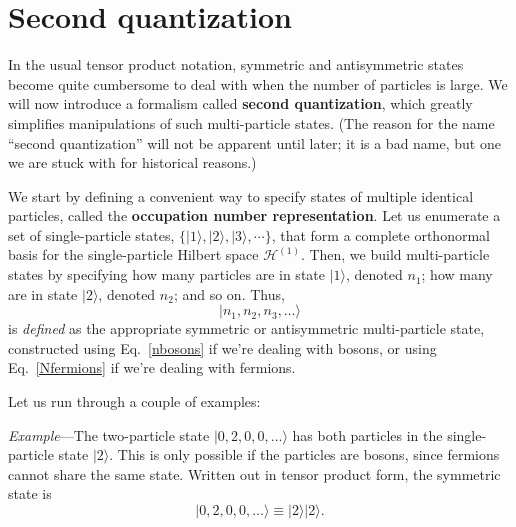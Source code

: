 \documentclass[pra,12pt]{revtex4-2}
\begin{document}
\section{Second quantization}

In the usual tensor product notation, symmetric and antisymmetric
states become quite cumbersome to deal with when the number of
particles is large.  We will now introduce a formalism called
\textbf{second quantization}, which greatly simplifies manipulations
of such multi-particle states.  (The reason for the name ``second
quantization'' will not be apparent until later; it is a bad name, but
one we are stuck with for historical reasons.)

We start by defining a convenient way to specify states of multiple
identical particles, called the \textbf{occupation number
  representation}.  Let us enumerate a set of single-particle states,
$\{|1\rangle, |2\rangle, |3\rangle, \cdots\}$, that form a complete
orthonormal basis for the single-particle Hilbert space
$\mathscr{H}^{(1)}$.  Then, we build multi-particle states by
specifying how many particles are in state $|1\rangle$, denoted $n_1$;
how many are in state $|2\rangle$, denoted $n_2$; and so on.  Thus,
\begin{equation*}
  |n_1,n_2,n_3,\dots\rangle
\end{equation*}
is \textit{defined} as the appropriate symmetric or antisymmetric
multi-particle state, constructed using Eq.~\eqref{nbosons} if we're
dealing with bosons, or using Eq.~\eqref{Nfermions} if we're dealing
with fermions.

Let us run through a couple of examples:

\begin{framed}
\noindent
\textit{Example}---The two-particle state $|0,2,0,0,\dots\rangle$ has
both particles in the single-particle state $|2\rangle$.  This is only
possible if the particles are bosons, since fermions cannot share the
same state.  Written out in tensor product form, the symmetric state
is
\begin{equation}
  |0,2,0,0,\dots\rangle \equiv |2\rangle|2\rangle.
\end{equation}
\end{framed}
\end{document}
